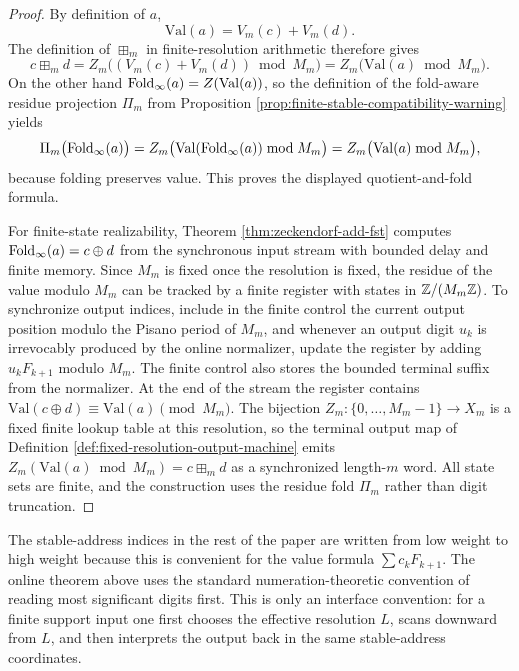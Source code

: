 \begin{proof}
By definition of \(a\),
\[
\mathrm{Val}(a)=V_m(c)+V_m(d).
\]
The definition of \(\boxplus_m\) in finite-resolution arithmetic therefore gives
\[
c\boxplus_m d
=Z_m\bigl((V_m(c)+V_m(d))\bmod M_m\bigr)
=Z_m\bigl(\mathrm{Val}(a)\bmod M_m\bigr).
\]
On the other hand \(\operatorname{Fold}_\infty(a)=Z(\mathrm{Val}(a))\), so the definition of the fold-aware residue projection \(\Pi_m\) from Proposition \ref{prop:finite-stable-compatibility-warning} yields
\[
\Pi_m\bigl(\operatorname{Fold}_\infty(a)\bigr)
=Z_m\bigl(\mathrm{Val}(\operatorname{Fold}_\infty(a))\bmod M_m\bigr)
=Z_m\bigl(\mathrm{Val}(a)\bmod M_m\bigr),
\]
because folding preserves value. This proves the displayed quotient-and-fold formula.

For finite-state realizability, Theorem \ref{thm:zeckendorf-add-fst} computes \(\operatorname{Fold}_\infty(a)=c\oplus d\) from the synchronous input stream with bounded delay and finite memory. Since \(M_m\) is fixed once the resolution is fixed, the residue of the value modulo \(M_m\) can be tracked by a finite register with states in \(\mathbb{Z}/(M_m\mathbb{Z})\). To synchronize output indices, include in the finite control the current output position modulo the Pisano period of \(M_m\), and whenever an output digit \(u_k\) is irrevocably produced by the online normalizer, update the register by adding \(u_kF_{k+1}\) modulo \(M_m\). The finite control also stores the bounded terminal suffix from the normalizer. At the end of the stream the register contains \(\mathrm{Val}(c\oplus d)\equiv\mathrm{Val}(a)\pmod {M_m}\). The bijection \(Z_m:\{0,
\dots,M_m-1\}\to X_m\) is a fixed finite lookup table at this resolution, so the terminal output map of Definition \ref{def:fixed-resolution-output-machine} emits \(Z_m(\mathrm{Val}(a)\bmod M_m)=c\boxplus_m d\) as a synchronized length-\(m\) word. All state sets are finite, and the construction uses the residue fold \(\Pi_m\) rather than digit truncation.
\end{proof}

\begin{remark}\label{rem:online-orientation}
The stable-address indices in the rest of the paper are written from low weight to high weight because this is convenient for the value formula \(\sum c_kF_{k+1}\). The online theorem above uses the standard numeration-theoretic convention of reading most significant digits first. This is only an interface convention: for a finite support input one first chooses the effective resolution \(L\), scans downward from \(L\), and then interprets the output back in the same stable-address coordinates.
\end{remark}

